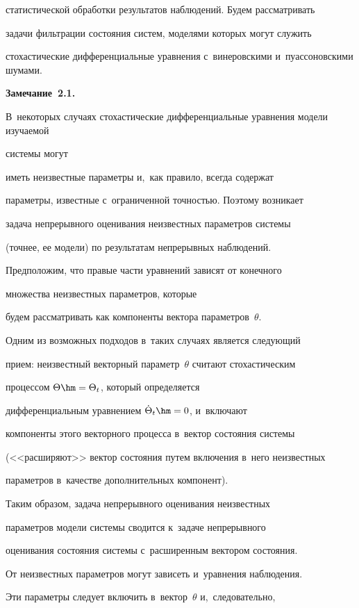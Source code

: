статистической обработки результатов наблюдений. Будем рассматривать

задачи фильтрации состояния систем, моделями которых могут служить

стохастические дифференциальные  уравнения с~винеровскими и~пуассоновскими шумами.



\smallskip



\noindent

\textbf{Замечание\ 2.1.}\

В~некоторых случаях стохастические дифференциальные уравнения модели изучаемой 

системы могут

иметь неизвестные параметры и,~как правило, всегда содержат

параметры, известные с~ограниченной точностью. Поэтому возникает

задача непрерывного оценивания неизвестных параметров системы

(точнее, ее модели) по результатам непрерывных наблюдений.

Предположим, что правые части уравнений зависят от конечного 

множества неизвестных параметров, которые

будем рассматривать как компоненты вектора параметров~$\theta$.

Одним из возможных подходов в~таких случаях является следующий

прием: неизвестный векторный параметр~$\theta$ считают стохастическим

процессом  $\Theta \hm=\Theta_t$, который определяется

дифференциальным уравнением $\dot\Theta_t \hm=0$, и~включают

компоненты этого векторного процесса в~вектор состояния системы

(<<расширяют>> вектор состояния путем включения в~него неизвестных

параметров в~качестве дополнительных компонент).

Таким образом, задача непрерывного оценивания неизвестных

параметров модели системы сводится к~задаче непрерывного

оценивания состояния системы с~расширенным вектором состояния.

От неизвестных параметров могут зависеть и~уравнения наблюдения. 

Эти параметры следует включить в~вектор~$\theta$ и,~следовательно, 

